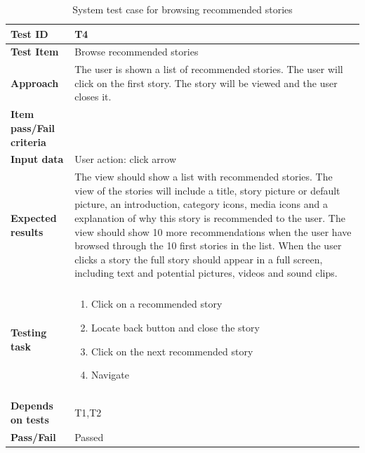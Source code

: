 \begin{appendices}
	\begin{table}[H]
		\small
		\centering
		\caption{System test case for browsing recommended stories}
		\begin{tabular}{ | l | l  |}
			\hline
			\hline
			\textbf{Test ID} & T4  \\ \hline
			\textbf{Test Item} & Browse recommended stories \\ \hline
			\textbf{Approach} & \begin{minipage}{5in}The user is shown a list of recommended stories. The user will click on the first story. The story will be viewed and the user closes it. 
			\end{minipage}\\ \hline
			\textbf{Item pass/Fail criteria} &  \\ \hline			
			\textbf{Input data} &  User action: click arrow\\ \hline
			\textbf{Expected results} & \begin{minipage}{5in}The view should show a list with recommended stories. The view of the stories will include a title, story picture or default picture, an introduction, category icons, media icons and a explanation of why this story is recommended to the user.  The view should show 10 more recommendations when the user have browsed through the 10 first stories in the list.
			When the user clicks a story the full story should appear in a full screen, including text and potential pictures, videos and sound clips.   \end{minipage}\\ \hline&\\[-3.8ex]
			\textbf{Testing task} & \begin{minipage}{5in}
			\begin{enumerate}[noitemsep]
			\item Click on a recommended story
			\item Locate back button and close the story
			\item Click on the next recommended story
			\item Navigate 
			\end{enumerate}\end{minipage}
			\\ &\\[-3.8ex]\hline
			\textbf{Depends on tests} & T1,T2 \\ \hline		
			\textbf{Pass/Fail} & Passed \\\hline			
		\end{tabular}
	

\end{table}
\end{appendices}
